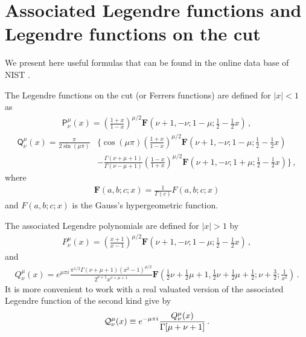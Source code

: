 \documentclass[aps,10pt,prd,groupedaddress,nofootinbib,notitlepage,eqsecnum,preprintnumbers]{revtex4-1}
\begin{document}
\section{Associated Legendre functions and Legendre functions on the cut\label{App:legendre}}

We present here useful formulas that can be found in the online data base of NIST \cite{NIST:DLMF}.

The Legendre functions on the cut (or Ferrers functions) are defined for $|x|<1$ as
\begin{align}
\mathsf{P}^{\mu}_{\nu}\left(x\right)=\left(\frac{1+x}{1-x}\right)^{\mu/2}%
\mathbf{F}\left(\nu+1,-\nu;1-\mu;\tfrac{1}{2}-\tfrac{1}{2}x\right)\,,
\end{align}
\begin{align}
\mathsf{Q}^{\mu}_{\nu}\left(x\right)=\frac{\pi}{2\sin\left(\mu\pi\right)}&\Bigg\{%
\cos\left(\mu\pi\right)\left(\frac{1+x}{1-x}\right)^{\mu/2}\mathbf{F}\left(%
\nu+1,-\nu;1-\mu;\tfrac{1}{2}-\tfrac{1}{2}x\right)\\&-\frac{\Gamma\left(\nu+\mu+1%
\right)}{\Gamma\left(\nu-\mu+1\right)}\left(\frac{1-x}{1+x}\right)^{\mu/2}%
\mathbf{F}\left(\nu+1,-\nu;1+\mu;\tfrac{1}{2}-\tfrac{1}{2}x\right)\Bigg\}\,,
\end{align}
where
\begin{align}
\mathbf{F}\left(a,b;c;x\right)=\frac{1}{\Gamma\left(c\right)}F\left(a,b;c;x\right)
\end{align}
and $F\left(a,b;c;x\right)$ is the Gauss's hypergeometric function.

The associated Legendre polynomials are defined for $|x|>1$ by 
\begin{align}
P^{\mu}_{\nu}\left(x\right)=\left(\frac{x+1}{x-1}\right)^{\mu/2}\mathbf{F}%
\left(\nu+1,-\nu;1-\mu;\tfrac{1}{2}-\tfrac{1}{2}x\right)\,,
\end{align}
and
\begin{align}
Q^{\mu}_{\nu}\left(x\right)=e^{\mu\pi i}\frac{\pi^{1/2}\Gamma\left(\nu+\mu+1%
\right)\left(x^{2}-1\right)^{\mu/2}}{2^{\nu+1}x^{\nu+\mu+1}}\mathbf{F}\left(%
\tfrac{1}{2}\nu+\tfrac{1}{2}\mu+1,\tfrac{1}{2}\nu+\tfrac{1}{2}\mu+\tfrac{1}{2}%
;\nu+\tfrac{3}{2};\frac{1}{x^{2}}\right)\,.
\end{align}
It is more convenient to work with a real valuated version of the associated Legendre function of the second kind give by
\begin{align}
{\cal Q}_{\nu}^\mu(x)\equiv e^{-\mu\pi i}\frac{Q_{\nu}^\mu(x)}{\Gamma[\mu+\nu+1]}\,.
\end{align}
\end{document}
